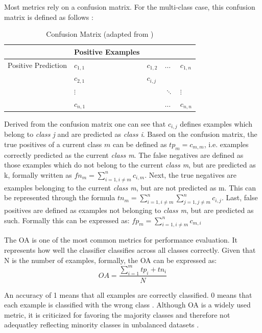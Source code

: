 \documentclass[12pt, a4paper, titlepage]{article}
\begin{document}
Most metrics rely on a confusion matrix. For the multi-class case, this confusion matrix is defined as follows \citep{Kautz2017}: 
\begin{table}[]
  \center
  \begin{tabular}{lllll}
  \hline
            & Positive Examples      &           &             &             \\ \hline
  Positive Prediction  & $c_{1,1}$ & $c_{1,2}$ & $\dots$     & $c_{1,n}$   \\
            & $c_{2,1}$ & $c_{i,j}$ &             &             \\
            &  $\vdots$         &           & $\ddots$ &   $\vdots$\\
            & $c_{n,1}$ &           & $\dots$     & $c_{n,n}$   \\ \hline
  \end{tabular}
  \caption[Confusion Matrix]{\label{tab: T1} Confusion Matrix (adapted from \citep[113]{Kautz2017})}
  \end{table}


\FloatBarrier
Derived from the confusion matrix one can see that $c_{i, j}$ defines examples which belong to  \textit{class j} and are predicted as \textit{class i}. Based on the confusion matrix, the true positives of a current class $m$ can be defined as $tp_{m} = c_{m, m}$, i.e. examples correctly predicted as the current  \textit{class m}. The false negatives are defined as those examples which do not belong to the current \textit{class m}, but are predicted as k, formally written as $fn_{m} = \sum_{i=1, i \neq m}^n c_{i, m}$. Next, the true negatives are examples belonging to the current  \textit{class m}, but are not predicted as m. This can be represented through the formula $tn_{m} = \sum_{i=1, i\neq m}^n \sum_{j=1, j \neq m}^n c_{i,j}$. Last, false positives are defined as examples not belonging to  \textit{class m}, but are predicted as such. Formally this can be expressed as: $fp_{m} =  \sum_{i=1, i \neq m}^n c_{m, i}$ \citep{Kautz2017}

The \ac{OA} is one of the most common metrics for performance evaluation. It represents how well the classifier classifies across all classes correctly. Given that N is the number of examples, formally, the \ac{OA} can be expressed as: 
\[OA = \frac{\sum_{i=1}^m tp_i + tn_i}{N} \]

An accuracy of 1 means that all examples are correctly classified. 0 means that each example is classified with the wrong class \citep{Berthold2020}. Although \ac{OA} is a widely used metric, it is criticized for favoring the majority classes and therefore not adequatley reflecting minority classes in unbalanced datasets \citep{Berthold2020, Fatourechi2008}.
\end{document}

